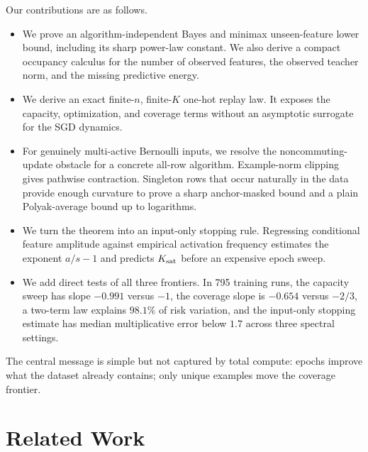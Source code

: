 \documentclass[letterpaper]{article}
\begin{document}
Our contributions are as follows.
\begin{itemize}
\item We prove an algorithm-independent Bayes and minimax unseen-feature lower
bound, including its sharp power-law constant. We also derive a compact
occupancy calculus for the number of observed features, the observed teacher
norm, and the missing predictive energy.
\item We derive an exact finite-$n$, finite-$K$ one-hot replay law. It exposes
the capacity, optimization, and coverage terms without an asymptotic surrogate
for the SGD dynamics.
\item For genuinely multi-active Bernoulli inputs, we resolve the
noncommuting-update obstacle for a concrete all-row algorithm. Example-norm
clipping gives pathwise contraction. Singleton rows that occur naturally in the
data provide enough curvature to prove a sharp anchor-masked bound and a plain
Polyak-average bound up to logarithms.
\item We turn the theorem into an input-only stopping rule. Regressing conditional
feature amplitude against empirical activation frequency estimates the exponent
$a/s-1$ and predicts $K_{\rm sat}$ before an expensive epoch sweep.
\item We add direct tests of all three frontiers. In 795 training runs, the
capacity sweep has slope $-0.991$ versus $-1$, the coverage slope is $-0.654$
versus $-2/3$, a two-term law explains $98.1\%$ of risk variation, and the
input-only stopping estimate has median multiplicative error below $1.7$ across
three spectral settings.
\end{itemize}

The central message is simple but not captured by total compute: epochs improve
what the dataset already contains; only unique examples move the coverage
frontier.

\section{Related Work}
\end{document}

